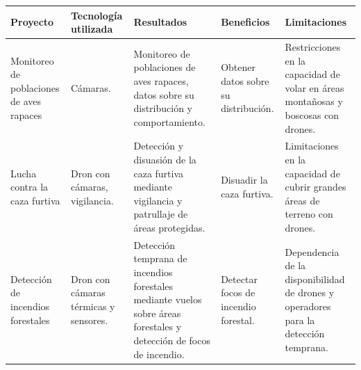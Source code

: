 \begin{table}[]
\centering

\begin{tabular}{|m{}|m{}|m{}|m{}|m{}|}
\hline
Proyecto                                               & Tecnología utilizada                         & Resultados                                                                                                                                                                                  & Beneficios                                      & Limitaciones                                                                                                                            \\ \hline
Monitoreo de poblaciones de aves rapaces               & Cámaras.                                     & Monitoreo de poblaciones de aves rapaces, datos sobre su distribución y comportamiento.                                                                                                     & Obtener datos sobre su distribución.            & Restricciones en la capacidad de volar en áreas montañosas y boscosas con drones.                                                       \\ \hline
Lucha contra la caza furtiva                           & Dron con cámaras, vigilancia.                & Detección y disuasión de la caza furtiva mediante vigilancia y patrullaje de áreas protegidas.                                                                                              & Disuadir la caza furtiva.                       & Limitaciones en la capacidad de cubrir grandes áreas de terreno con drones.                                                             \\ \hline
Detección de incendios forestales                      & Dron con cámaras térmicas y sensores.        & Detección temprana de incendios forestales mediante vuelos sobre áreas forestales y detección de focos de incendio.                                                                         & Detectar focos de incendio forestal.            & Dependencia de la disponibilidad de drones y operadores para la detección temprana.                                                     \\ \hline

\end{tabular}
\end{table}


